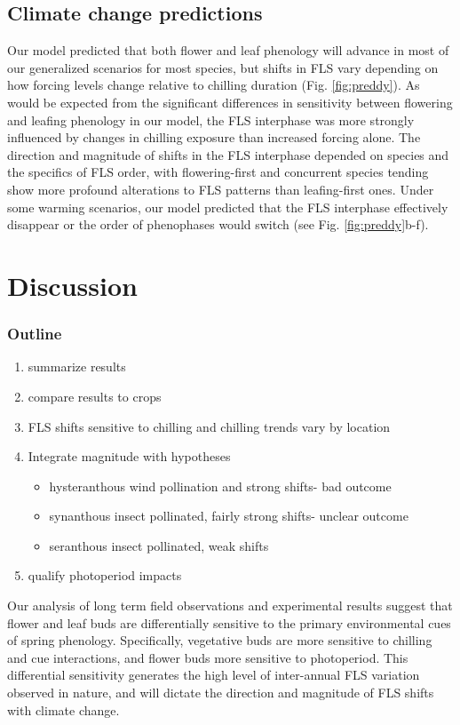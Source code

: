 \documentclass[11pt]{article}
\begin{document}
\subsection*{Climate change predictions}
\noindent Our model predicted that both flower and leaf phenology will advance in most of our generalized scenarios for most species, but shifts in FLS vary depending on how forcing levels change relative to chilling duration (Fig. \ref{fig:preddy}). As would be expected from the significant differences in sensitivity between flowering and leafing phenology in our model, the FLS interphase was more strongly influenced by changes in chilling exposure than increased forcing alone. The direction and magnitude of shifts in the FLS interphase depended on species and the specifics of FLS order, with flowering-first and concurrent species tending show more profound alterations to FLS patterns than leafing-first ones. Under some warming scenarios, our model predicted that the FLS interphase effectively disappear or the order of phenophases would switch (see Fig. \ref{fig:preddy}b-f).

\section*{Discussion}
\subsubsection*{Outline}
\begin{enumerate}
\item summarize results
\item compare results to crops
\item FLS shifts sensitive to chilling and chilling trends vary by location
\item Integrate magnitude with hypotheses
\begin{itemize}
\item hysteranthous wind pollination and strong shifts- bad outcome
\item synanthous insect pollinated, fairly strong shifts- unclear outcome
\item seranthous insect pollinated, weak shifts
\end{itemize}
\item qualify photoperiod impacts
\end{enumerate}

\noindent Our analysis of long term field observations and experimental results suggest that flower and leaf buds are differentially sensitive to the primary environmental cues of spring phenology. Specifically, vegetative buds are more sensitive to chilling and cue interactions, and flower buds more sensitive to photoperiod. This differential sensitivity generates the high level of inter-annual FLS variation observed in nature, and will dictate the direction and magnitude of FLS shifts with climate change.\\
\end{document}
